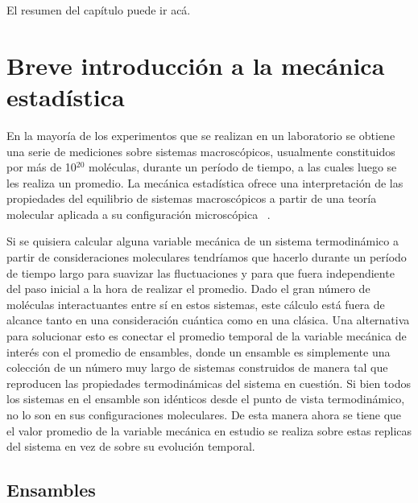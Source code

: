 El resumen del capítulo puede ir acá.

\section{Breve introducción a la mecánica estadística}

En la mayoría de los experimentos que se realizan en un laboratorio se obtiene 
una serie de mediciones sobre sistemas macroscópicos, usualmente constituidos por 
más de 10$^{20}$ moléculas, durante un período de tiempo, a las cuales luego se 
les realiza un promedio. La mecánica estadística ofrece una interpretación de 
las propiedades del equilibrio de sistemas macroscópicos a partir de una teoría 
molecular aplicada a su configuración microscópica ~\cite{hill1986}.

Si se quisiera calcular alguna variable mecánica de un sistema termodinámico a
partir de consideraciones moleculares tendríamos que hacerlo durante un período
de tiempo largo para suavizar las fluctuaciones y para que fuera independiente
del paso inicial a la hora de realizar el promedio. Dado el gran número de 
moléculas interactuantes entre sí en estos sistemas, este cálculo está fuera de
alcance tanto en una consideración cuántica como en una clásica. Una alternativa
para solucionar esto es conectar el promedio temporal de la variable mecánica de
interés con el promedio de ensambles, donde un ensamble es simplemente una 
colección de un número muy largo de sistemas construidos de manera tal que 
reproducen las propiedades termodinámicas del sistema en cuestión. Si bien todos
los sistemas en el ensamble son idénticos desde el punto de vista termodinámico,
no lo son en sus configuraciones moleculares. De esta manera ahora se tiene
que el valor promedio de la variable mecánica en estudio se realiza sobre estas 
replicas del sistema en vez de sobre su evolución temporal.

\subsection{Ensambles}

